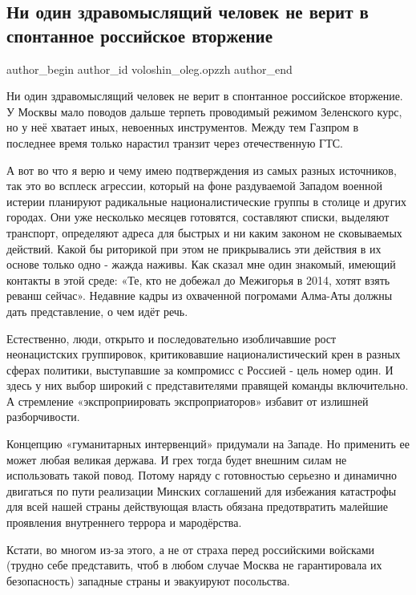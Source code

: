  
 
 
 
 
 
\subsection{Ни один здравомыслящий человек не верит в спонтанное российское вторжение}
\label{sec:14_02_2022.fb.voloshin_oleg.opzzh.1.vtorzhenie}
 
\ifcmt
 author_begin
   author_id voloshin_oleg.opzzh
 author_end
\fi

Ни один здравомыслящий человек не верит в спонтанное российское вторжение. У
Москвы мало поводов дальше терпеть проводимый режимом Зеленского курс, но у неё
хватает иных, невоенных инструментов. Между тем Газпром в последнее время
только нарастил транзит через отечественную ГТС.

А вот во что я верю и чему имею подтверждения из самых разных источников, так
это во всплеск агрессии, который на фоне раздуваемой Западом военной истерии
планируют радикальные националистические группы в столице и других городах. Они
уже несколько месяцев готовятся, составляют списки, выделяют транспорт,
определяют адреса для быстрых и ни каким законом не сковываемых действий. Какой
бы риторикой при этом не прикрывались эти действия в их основе только одно -
жажда наживы. Как сказал мне один знакомый, имеющий контакты в этой среде: «Те,
кто не добежал до Межигорья в 2014, хотят взять реванш сейчас». Недавние кадры
из охваченной погромами Алма-Аты должны дать представление, о чем идёт речь. 

Естественно, люди, открыто и последовательно изобличавшие рост неонацистских
группировок, критиковавшие националистический крен в разных сферах политики,
выступавшие за компромисс с Россией - цель номер один. И здесь у них выбор
широкий с представителями правящей команды включительно. А стремление
«экспроприировать экспроприаторов» избавит от излишней разборчивости. 

Концепцию «гуманитарных интервенций» придумали на Западе. Но применить ее может
любая великая держава. И грех тогда будет внешним силам не использовать такой
повод. Потому наряду с готовностью серьезно и динамично двигаться по пути
реализации Минских соглашений для избежания катастрофы для всей нашей страны
действующая власть обязана предотвратить малейшие проявления внутреннего
террора и мародёрства. 

Кстати, во многом из-за этого, а не от страха перед российскими войсками
(трудно себе представить, чтоб в любом случае Москва не гарантировала их
безопасность) западные страны и эвакуируют посольства.
